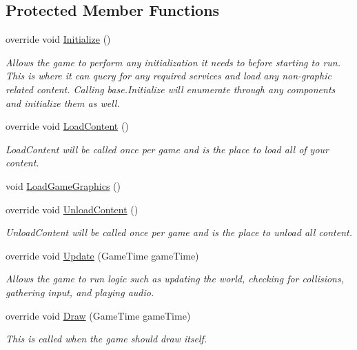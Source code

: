 \subsection*{Protected Member Functions}
\begin{DoxyCompactItemize}
\item 
override void \hyperlink{class_ping___pong_1_1_game1_ae8a0320b8583f5f671dcf98a5ca232df}{Initialize} ()
\begin{DoxyCompactList}\small\item\em Allows the game to perform any initialization it needs to before starting to run. This is where it can query for any required services and load any non-\/graphic related content. Calling base.\-Initialize will enumerate through any components and initialize them as well. \end{DoxyCompactList}\item 
override void \hyperlink{class_ping___pong_1_1_game1_a6d3747853eb20dd83968478792b1a19d}{Load\-Content} ()
\begin{DoxyCompactList}\small\item\em Load\-Content will be called once per game and is the place to load all of your content. \end{DoxyCompactList}\item 
void \hyperlink{class_ping___pong_1_1_game1_ac022f03857d45e8396e520c70eceb9c5}{Load\-Game\-Graphics} ()
\item 
override void \hyperlink{class_ping___pong_1_1_game1_a558bcf5c17e9f410d5cceb2f66e2dd67}{Unload\-Content} ()
\begin{DoxyCompactList}\small\item\em Unload\-Content will be called once per game and is the place to unload all content. \end{DoxyCompactList}\item 
override void \hyperlink{class_ping___pong_1_1_game1_adcf5d3a66fa192e3318b14188dd0c34a}{Update} (Game\-Time game\-Time)
\begin{DoxyCompactList}\small\item\em Allows the game to run logic such as updating the world, checking for collisions, gathering input, and playing audio. \end{DoxyCompactList}\item 
override void \hyperlink{class_ping___pong_1_1_game1_a4ce721b84f4194ecc1a8bf27b27f0955}{Draw} (Game\-Time game\-Time)
\begin{DoxyCompactList}\small\item\em This is called when the game should draw itself. \end{DoxyCompactList}\end{DoxyCompactItemize}
